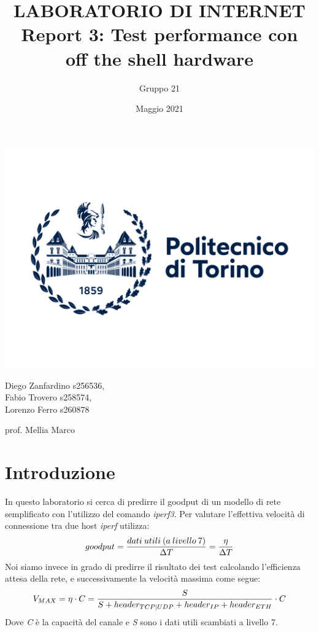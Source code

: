 \documentclass{article}
\title{\Huge LABORATORIO DI INTERNET 
    \\ Report 3: Test performance con\\ off the shell hardware}
\author{Gruppo 21}
\date{Maggio 2021}
\begin{document}
    \maketitle

    \begin{center}
        \includegraphics[scale=0.1]{polito_logo_2021_blu.jpg}

        \vspace{20mm}

        Diego Zanfardino s256536, \\
        Fabio Trovero s258574, \\
        Lorenzo Ferro s260878

        \vspace{10mm}
        prof. Mellia Marco
    \end{center}

    \pagebreak


    \section{Introduzione}
    In questo laboratorio si cerca di predirre il goodput di un modello di rete semplificato con
    l'utilizzo del comando \textit{iperf3}. Per valutare l'effettiva velocità di connessione tra due 
    host \textit{iperf} utilizza: 
    \begin{equation}
        \centering
        goodput = \frac{ dati\:utili\:(a\:livello\:7)}{\Delta T } = \frac{\eta}{\Delta T } 
    \end{equation}
    Noi siamo invece in grado di predirre il risultato dei test calcolando l'efficienza
    attesa della rete, e successivamente la velocità massima come segue:
    \begin{equation}
        \centering
        V_{MAX} = \eta \cdot C = \frac{S}{S+header_{TCP|UDP}+header_{IP}+header_{ETH}} \cdot C
    \end{equation}
    Dove \textit{C} è la capacità del canale e \textit{S} sono i dati utili 
    scambiati a livello 7. 
\end{document}
